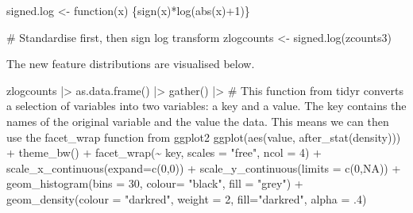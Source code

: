 \documentclass[
  letterpaper,
  DIV=11,
  numbers=noendperiod]{scrreprt}
\newenvironment{Shaded}{\begin{snugshade}}{\end{snugshade}}
\newcommand{\AttributeTok}[1]{\textcolor[rgb]{0.40,0.45,0.13}{#1}}
\newcommand{\CommentTok}[1]{\textcolor[rgb]{0.37,0.37,0.37}{#1}}
\newcommand{\ConstantTok}[1]{\textcolor[rgb]{0.56,0.35,0.01}{#1}}
\newcommand{\ControlFlowTok}[1]{\textcolor[rgb]{0.00,0.23,0.31}{#1}}
\newcommand{\DecValTok}[1]{\textcolor[rgb]{0.68,0.00,0.00}{#1}}
\newcommand{\FunctionTok}[1]{\textcolor[rgb]{0.28,0.35,0.67}{#1}}
\newcommand{\NormalTok}[1]{\textcolor[rgb]{0.00,0.23,0.31}{#1}}
\newcommand{\OtherTok}[1]{\textcolor[rgb]{0.00,0.23,0.31}{#1}}
\newcommand{\SpecialCharTok}[1]{\textcolor[rgb]{0.37,0.37,0.37}{#1}}
\newcommand{\StringTok}[1]{\textcolor[rgb]{0.13,0.47,0.30}{#1}}
\begin{document}
\begin{Shaded}
\begin{Highlighting}[]
\NormalTok{signed.log }\OtherTok{\textless{}{-}} \ControlFlowTok{function}\NormalTok{(x) \{}\FunctionTok{sign}\NormalTok{(x)}\SpecialCharTok{*}\FunctionTok{log}\NormalTok{(}\FunctionTok{abs}\NormalTok{(x)}\SpecialCharTok{+}\DecValTok{1}\NormalTok{)\}}

\CommentTok{\# Standardise first, then sign log transform}
\NormalTok{zlogcounts }\OtherTok{\textless{}{-}} \FunctionTok{signed.log}\NormalTok{(zcounts3) }
\end{Highlighting}
\end{Shaded}

The new feature distributions are visualised below.

\begin{Shaded}
\begin{Highlighting}[]
\NormalTok{zlogcounts }\SpecialCharTok{|\textgreater{}}
  \FunctionTok{as.data.frame}\NormalTok{() }\SpecialCharTok{|\textgreater{}} 
  \FunctionTok{gather}\NormalTok{() }\SpecialCharTok{|\textgreater{}} \CommentTok{\# This function from tidyr converts a selection of variables into two variables: a key and a value. The key contains the names of the original variable and the value the data. This means we can then use the facet\_wrap function from ggplot2}
  \FunctionTok{ggplot}\NormalTok{(}\FunctionTok{aes}\NormalTok{(value, }\FunctionTok{after\_stat}\NormalTok{(density))) }\SpecialCharTok{+}
  \FunctionTok{theme\_bw}\NormalTok{() }\SpecialCharTok{+}
  \FunctionTok{facet\_wrap}\NormalTok{(}\SpecialCharTok{\textasciitilde{}}\NormalTok{ key, }\AttributeTok{scales =} \StringTok{"free"}\NormalTok{, }\AttributeTok{ncol =} \DecValTok{4}\NormalTok{) }\SpecialCharTok{+}
  \FunctionTok{scale\_x\_continuous}\NormalTok{(}\AttributeTok{expand=}\FunctionTok{c}\NormalTok{(}\DecValTok{0}\NormalTok{,}\DecValTok{0}\NormalTok{)) }\SpecialCharTok{+}
  \FunctionTok{scale\_y\_continuous}\NormalTok{(}\AttributeTok{limits =} \FunctionTok{c}\NormalTok{(}\DecValTok{0}\NormalTok{,}\ConstantTok{NA}\NormalTok{)) }\SpecialCharTok{+}
  \FunctionTok{geom\_histogram}\NormalTok{(}\AttributeTok{bins =} \DecValTok{30}\NormalTok{, }\AttributeTok{colour=} \StringTok{"black"}\NormalTok{, }\AttributeTok{fill =} \StringTok{"grey"}\NormalTok{) }\SpecialCharTok{+}
  \FunctionTok{geom\_density}\NormalTok{(}\AttributeTok{colour =} \StringTok{"darkred"}\NormalTok{, }\AttributeTok{weight =} \DecValTok{2}\NormalTok{, }\AttributeTok{fill=}\StringTok{"darkred"}\NormalTok{, }\AttributeTok{alpha =}\NormalTok{ .}\DecValTok{4}\NormalTok{)}
\end{Highlighting}
\end{Shaded}
\end{document}
